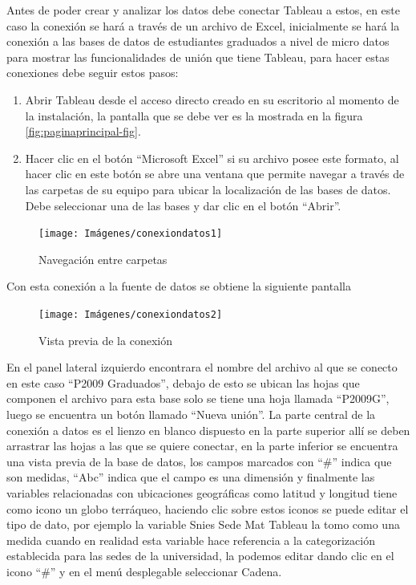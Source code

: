 \documentclass[
]{book}
\begin{document}
Antes de poder crear y analizar los datos debe conectar Tableau a estos, en este caso la conexión se hará a través de un archivo de Excel, inicialmente se hará la conexión a las bases de datos de estudiantes graduados a nivel de micro datos para mostrar las funcionalidades de unión que tiene Tableau, para hacer estas conexiones debe seguir estos pasos:

\begin{enumerate}
\def\labelenumi{\arabic{enumi}.}
\item
  Abrir Tableau desde el acceso directo creado en su escritorio al momento de la instalación, la pantalla que se debe ver es la mostrada en la figura \ref{fig:paginaprincipal-fig}.
\item
  Hacer clic en el botón ``Microsoft Excel'' si su archivo posee este formato, al hacer clic en este botón se abre una ventana que permite navegar a través de las carpetas de su equipo para ubicar la localización de las bases de datos. Debe seleccionar una de las bases y dar clic en el botón ``Abrir''.
\end{enumerate}

\begin{figure}

{\centering \texttt{[image: Imágenes/conexiondatos1]} 

}

\caption{Navegación entre carpetas}\label{fig:carpetas-fig}
\end{figure}

Con esta conexión a la fuente de datos se obtiene la siguiente pantalla

\begin{figure}

{\centering \texttt{[image: Imágenes/conexiondatos2]} 

}

\caption{Vista previa de la conexión}\label{fig:pantallaconexiondatos-fig}
\end{figure}

En el panel lateral izquierdo encontrara el nombre del archivo al que se conecto en este caso ``P2009 Graduados'', debajo de esto se ubican las hojas que componen el archivo para esta base solo se tiene una hoja llamada ``P2009G'', luego se encuentra un botón llamado ``Nueva unión''. La parte central de la conexión a datos es el lienzo en blanco dispuesto en la parte superior allí se deben arrastrar las hojas a las que se quiere conectar, en la parte inferior se encuentra una vista previa de la base de datos, los campos marcados con ``\#'' indica que son medidas, ``Abc'' indica que el campo es una dimensión y finalmente las variables relacionadas con ubicaciones geográficas como latitud y longitud tiene como icono un globo terráqueo, haciendo clic sobre estos iconos se puede editar el tipo de dato, por ejemplo la variable Snies Sede Mat Tableau la tomo como una medida cuando en realidad esta variable hace referencia a la categorización establecida para las sedes de la universidad, la podemos editar dando clic en el icono ``\#'' y en el menú desplegable seleccionar Cadena.
\end{document}
